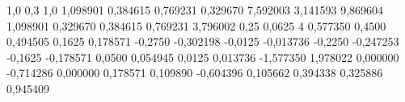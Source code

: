 \expandafter\def\csname dato:E\endcsname{1{,}0}
\expandafter\def\csname dato:nu\endcsname{0{,}3}
\expandafter\def\csname dato:t\endcsname{1{,}0}
\expandafter\def\csname dato:c\endcsname{1{,}098901}
\expandafter\def\csname dato:mu\endcsname{0{,}384615}
\expandafter\def\csname dato:dosmu\endcsname{0{,}769231}
\expandafter\def\csname dato:lam\endcsname{0{,}329670}
\expandafter\def\csname dato:K2\endcsname{7{,}592003}
\expandafter\def\csname dato:pi\endcsname{3{,}141593}
\expandafter\def\csname dato:pi2\endcsname{9{,}869604}
\expandafter\def\csname dato:D11\endcsname{1{,}098901}
\expandafter\def\csname dato:D12\endcsname{0{,}329670}
\expandafter\def\csname dato:D33\endcsname{0{,}384615}
\expandafter\def\csname dato:DdifD\endcsname{0{,}769231}
\expandafter\def\csname dato:bmuestra\endcsname{3{,}796002}
\expandafter\def\csname dato:J11\endcsname{0{,}25}
\expandafter\def\csname dato:detJ\endcsname{0{,}0625}
\expandafter\def\csname dato:Jinv\endcsname{4}
\expandafter\def\csname dato:gdos\endcsname{0{,}577350}
\expandafter\def\csname dato:k1\endcsname{0{,}4500}
\expandafter\def\csname dato:ck1\endcsname{0{,}494505}
\expandafter\def\csname dato:k2\endcsname{0{,}1625}
\expandafter\def\csname dato:ck2\endcsname{0{,}178571}
\expandafter\def\csname dato:k3\endcsname{-0{,}2750}
\expandafter\def\csname dato:ck3\endcsname{-0{,}302198}
\expandafter\def\csname dato:k4\endcsname{-0{,}0125}
\expandafter\def\csname dato:ck4\endcsname{-0{,}013736}
\expandafter\def\csname dato:k5\endcsname{-0{,}2250}
\expandafter\def\csname dato:ck5\endcsname{-0{,}247253}
\expandafter\def\csname dato:k6\endcsname{-0{,}1625}
\expandafter\def\csname dato:ck6\endcsname{-0{,}178571}
\expandafter\def\csname dato:k7\endcsname{0{,}0500}
\expandafter\def\csname dato:ck7\endcsname{0{,}054945}
\expandafter\def\csname dato:k8\endcsname{0{,}0125}
\expandafter\def\csname dato:ck8\endcsname{0{,}013736}
\expandafter\def\csname dato:Bdiag\endcsname{-1{,}577350}
\expandafter\def\csname dato:Kcc\endcsname{1{,}978022}
\expandafter\def\csname dato:Kccxy\endcsname{0{,}000000}
\expandafter\def\csname dato:Kfrx\endcsname{-0{,}714286}
\expandafter\def\csname dato:Kfry\endcsname{0{,}000000}
\expandafter\def\csname dato:nesq\endcsname{0{,}178571}
\expandafter\def\csname dato:Kvecx\endcsname{0{,}109890}
\expandafter\def\csname dato:Kvecy\endcsname{-0{,}604396}
\expandafter\def\csname dato:gA\endcsname{0{,}105662}
\expandafter\def\csname dato:gB\endcsname{0{,}394338}
\expandafter\def\csname dato:sA\endcsname{0{,}325886}
\expandafter\def\csname dato:sB\endcsname{0{,}945409}
